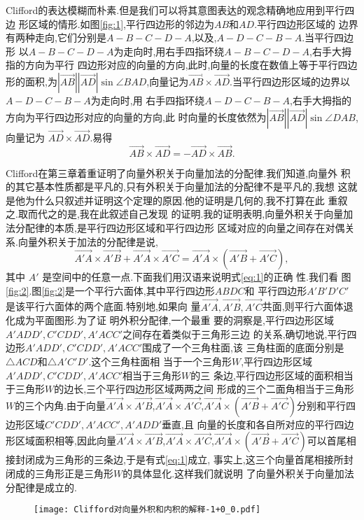 ﻿\documentclass[a4paper]{article}
\newcommand{\ov}{\overrightarrow}\newcommand{\ri}{\Rightarrow}
\begin{document}
Clifford的表达模糊而朴素.但是我们可以将其意图表达的观念精确地应用到平行四边
形区域的情形.如图\eqref{fig:1},平行四边形的邻边为$AB$和$AD$.平行四边形区域的
边界有两种走向,它们分别是$A-B-C-D-A$,以及,$A-D-C-B-A$.当平行四边形
以$A-B-C-D-A$为走向时,用右手四指环绕$A-B-C-D-A$,右手大拇指的方向为平行
四边形对应的向量的方向,此时,向量的长度在数值上等于平行四边形的面积,为$|\ov{AB}||\ov{AD}|\sin\angle
BAD$,向量记为$\ov{AB}\times \ov{AD}$.当平行四边形区域的边界以$A-D-C-B-A$为走向时,用
右手四指环绕$A-D-C-B-A$,右手大拇指的方向为平行四边形对应的向量的方向,此
时向量的长度依然为$|\ov{AB}||\ov{AD}|\sin\angle DAB$,向量记为
$\ov{AD}\times\ov{AD}$.易得
$$
\ov{AB}\times \ov{AD}=-\ov{AD}\times \ov{AB}.
$$


Clifford在第三章着重证明了向量外积关于向量加法的分配律.我们知道,向量外
积的其它基本性质都是平凡的,只有外积关于向量加法的分配律不是平凡的,我想
这就是他为什么只叙述并证明这个定理的原因.他的证明是几何的,我不打算在此
重叙之.取而代之的是,我在此叙述自己发现
的证明.我的证明表明,{\color{red}向量外积关于向量加法分配律的本质,是平行四边形区域和平行四边形
区域对应的向量之间存在对偶关系}.向量外积关于加法的分配律是说,
\begin{equation}
  \label{eq:1}
  \ov{A'A}\times \ov{A'B}+\ov{A'A}\times \ov{A'C}=\ov{A'A}\times(\ov{A'B}+\ov{A'C}),
\end{equation}
其中 $A'$ 是空间中的任意一点.下面我们用汉语来说明式\eqref{eq:1}的正确
性.我们看
图\eqref{fig:2}.图\eqref{fig:2}是一个平行六面体,其中平行四边形$ABDC$和
平行四边形$A'B'D'C'$是该平行六面体的两个底面.特别地,如果向
量$\ov{A'A},\ov{A'B},\ov{A'C}$共面,则平行六面体退化成为平面图形.为了证
明外积分配律,一个最重
要的洞察是,平行四边形区域$A'ADD',C'CDD',A'ACC'$之间存在着类似于三角形三边
的关系,确切地说,平行四边形$A'ADD',C'CDD',A'ACC'$围成了一个三角柱面,该
三角柱面的底面分别是$\triangle ACD$和$\triangle A'C'D'$.这个三角柱面相
当于一个三角形$W$,平行四边形区域$A'ADD',C'CDD',A'ACC'$相当于三角形$W$的三
条边,平行四边形区域的面积相当于三角形$W$的边长,三个平行四边形区域两两之间
形成的三个二面角相当于三角形$W$的三个内角.由于向量$\ov{A'A}\times
\ov{A'B}$,$\ov{A'A}\times \ov{A'C}$,$\ov{A'A}\times
(\ov{A'B}+\ov{A'C})$分别和平行四边形区域$C'CDD',A'ACC',A'ADD'$垂直,且
向量的长度和各自所对应的平行四边形区域面积相等,因此向量$\ov{A'A}\times
\ov{A'B}$,$\ov{A'A}\times \ov{A'C}$,$\ov{A'A}\times
(\ov{A'B}+\ov{A'C})$可以首尾相接封闭成为三角形的三条边,于是有式\eqref{eq:1}成立,
事实上,这三个向量首尾相接所封闭成的三角形正是三角形$W$的具体显化.这样我们就说明
了向量外积关于向量加法分配律是成立的.
\begin{figure}[h]
  \centering
\texttt{[image: Clifford对向量外积和内积的解释-1+0\_0.pdf]}
  \caption{}
  \label{fig:2}
\end{figure}
\end{document}
